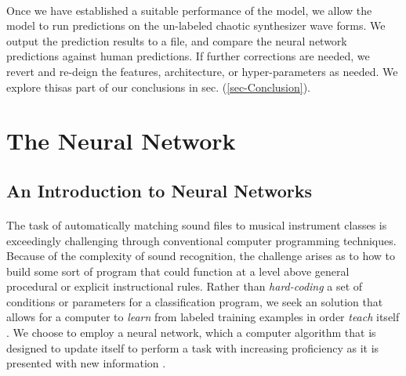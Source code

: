 \documentclass[12pt,letterpaper]{article}
\begin{document}
\paragraph*{}Once we have established a suitable performance of the model, we allow the model to run predictions on the un-labeled chaotic synthesizer wave forms. We output the prediction results to a file, and compare the neural network predictions against human predictions. If further corrections are needed, we revert and re-deign the features, architecture, or hyper-parameters as needed. We explore thisas part of our conclusions in sec. (\ref{sec-Conclusion}).


\newpage
\section{The Neural Network}
\label{sec-TheNeuralNetwork}


\subsection{An Introduction to Neural Networks}
\label{subsec-NerualNetworkIntro}

\paragraph*{}The task of automatically matching sound files to musical instrument classes is exceedingly challenging through conventional computer programming techniques. Because of the complexity of sound recognition, the challenge arises as to how to build some sort of program that could function at a level above general procedural or explicit instructional rules. Rather than \textit{hard-coding} a set of conditions or parameters for a classification program, we seek an solution that allows for a computer to \textit{learn} from labeled training examples in order \textit{teach} itself \cite{Bishop,Mitchell}. We choose to employ a neural network, which a computer algorithm that is designed to update itself to perform a task with increasing proficiency as it is presented with new information \cite{Geron2,Goodfellow,Levine,Mitchell}.
\end{document}

